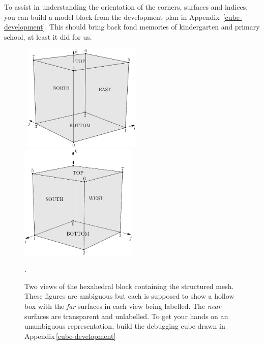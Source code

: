 \medskip
To assist in understanding the orientation of the corners, surfaces and indices,
you can build a model block from the development plan in Appendix~\ref{cube-development}.
This should bring back fond memories of kindergarten and primary school, 
at least it did for us.

 
\begin{figure}[htbp]
\mbox{
\includegraphics[width=0.5\textwidth]{figs/block3d-defn.pdf}
\includegraphics[width=0.5\textwidth]{figs/block3d-defn-2.pdf}
}
\caption{Two views of the hexahedral block containing the structured mesh.
    These figures are ambiguous but each is supposed to show a hollow box
    with the \textit{far} surfaces in each view being labelled.  
    The \textit{near} surfaces are transparent and unlabelled.
    To get your hands on an unambiguous representation, build the debugging cube
    drawn in Appendix\,\ref{cube-development}}.
\label{block-defn-fig}
\end{figure}

